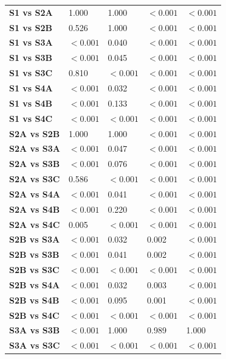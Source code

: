 \begin{table}[H]
{\begin{tabular}{lllll}
        \textbf{S1 vs S2A} & 1.000 & 1.000 & $< 0.001$ & $< 0.001$ \\
        \textbf{S1 vs S2B} & 0.526 & 1.000 & $< 0.001$ & $< 0.001$ \\
        \textbf{S1 vs S3A} & $< 0.001$ & 0.040 & $< 0.001$ & $< 0.001$ \\
        \textbf{S1 vs S3B} & $< 0.001$ & 0.045 & $< 0.001$ & $< 0.001$ \\
        \textbf{S1 vs S3C} & 0.810 & $< 0.001$ & $< 0.001$ & $< 0.001$ \\
        \textbf{S1 vs S4A} & $< 0.001$ & 0.032 & $< 0.001$ & $< 0.001$ \\
        \textbf{S1 vs S4B} & $< 0.001$ & 0.133 & $< 0.001$ & $< 0.001$ \\
        \textbf{S1 vs S4C} & $< 0.001$ & $< 0.001$ & $< 0.001$ & $< 0.001$ \\
        \textbf{S2A vs S2B} & 1.000 & 1.000 & $< 0.001$ & $< 0.001$ \\
        \textbf{S2A vs S3A} & $< 0.001$ & 0.047 & $< 0.001$ & $< 0.001$ \\
        \textbf{S2A vs S3B} & $< 0.001$ & 0.076 & $< 0.001$ & $< 0.001$ \\
        \textbf{S2A vs S3C} & 0.586 & $< 0.001$ & $< 0.001$ & $< 0.001$ \\
        \textbf{S2A vs S4A} & $< 0.001$ & 0.041 & $< 0.001$ & $< 0.001$ \\
        \textbf{S2A vs S4B} & $< 0.001$ & 0.220 & $< 0.001$ & $< 0.001$ \\
        \textbf{S2A vs S4C} & 0.005 & $< 0.001$ & $< 0.001$ & $< 0.001$ \\
        \textbf{S2B vs S3A} & $< 0.001$ & 0.032 & 0.002 & $< 0.001$ \\
        \textbf{S2B vs S3B} & $< 0.001$ & 0.041 & 0.002 & $< 0.001$ \\
        \textbf{S2B vs S3C} & $< 0.001$ & $< 0.001$ & $< 0.001$ & $< 0.001$ \\
        \textbf{S2B vs S4A} & $< 0.001$ & 0.032 & 0.003 & $< 0.001$ \\
        \textbf{S2B vs S4B} & $< 0.001$ & 0.095 & 0.001 & $< 0.001$ \\
        \textbf{S2B vs S4C} & $< 0.001$ & $< 0.001$ & $< 0.001$ & $< 0.001$ \\
        \textbf{S3A vs S3B} & $< 0.001$ & 1.000 & 0.989 & 1.000 \\
        \textbf{S3A vs S3C} & $< 0.001$ & $< 0.001$ & $< 0.001$ & $< 0.001$ \\

\end{tabular}}
\end{table}
